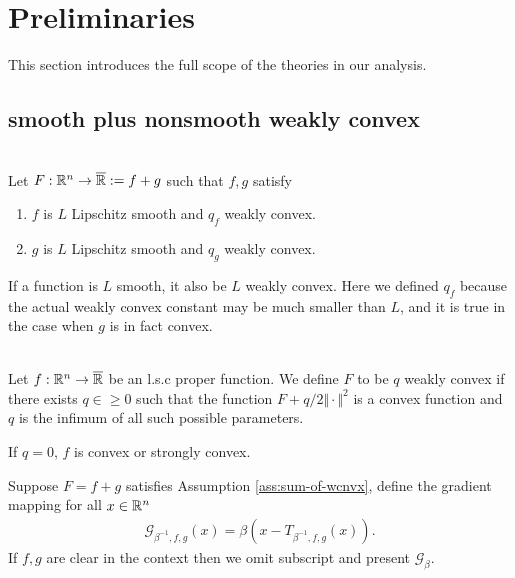 \documentclass[12pt]{report}
\begin{document}
    \section{Preliminaries}
        This section introduces the full scope of the theories in our analysis. 
        \subsection{smooth plus nonsmooth weakly convex}
            \begin{assumption}\;\label{ass:sum-of-wcnvx}\\
                Let $F: \mathbb R^n \rightarrow \overline{\mathbb R}:= f + g$ such that $f, g$ satisfy 
                \begin{enumerate}
                    \item $f$ is $L$ Lipschitz smooth and $q_f$ weakly convex. 
                    \item $g$ is $L$ Lipschitz smooth and $q_g$ weakly convex. 
                \end{enumerate}
            \end{assumption}
            \begin{remark}
                If a function is $L$ smooth, it also be $L$ weakly convex. 
                Here we defined $q_f$ because the actual weakly convex constant may be much smaller than $L$, and it is true in the case when $g$ is in fact convex.  
            \end{remark}
            \begin{definition}\;\label{def:wcnvx-fxn}\\
                Let $f: \mathbb R^n \rightarrow\overline {\mathbb R}$ be an l.s.c proper function. 
                We define $F$ to be $q$ weakly convex if there exists $q \in \ge 0$ such that the function $F + q/2\Vert \cdot\Vert^2$ is a convex function and $q$ is the infimum of all such possible parameters. 
            \end{definition}
            \begin{remark}
                If $q = 0$, $f$ is convex or strongly convex. 
            \end{remark}
            \begin{definition}
                Suppose $F = f + g$ satisfies Assumption \ref{ass:sum-of-wcnvx}, define the gradient mapping for all $x \in \mathbb R^n$
                \begin{align*}
                    \mathcal G_{\beta^{-1}, f, g}(x) = \beta(x - T_{\beta^{-1}, f, g}(x)). 
                \end{align*}
                If $f, g$ are clear in the context then we omit subscript and present $\mathcal G_\beta$. 
            \end{definition}
\end{document}
